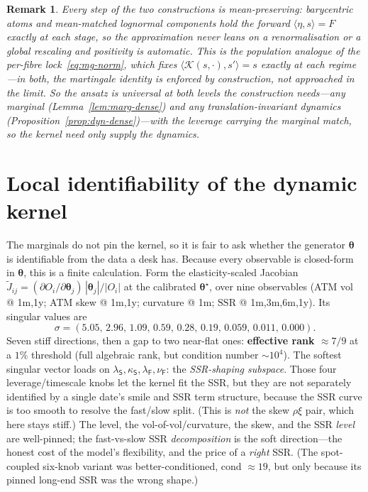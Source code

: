 \documentclass[11pt]{article}
\newtheorem{remark}{Remark}
\newcommand{\cK}{\mathcal{K}}
\newcommand{\SSR}{\mathrm{SSR}}
\newcommand{\bth}{{\boldsymbol{\theta}}}
\begin{document}
\begin{remark}
Every step of the two constructions is \emph{mean-preserving}: barycentric atoms and mean-matched
lognormal components hold the forward $\langle\eta,s\rangle=F$ exactly at each stage, so the approximation
never leans on a renormalisation or a global rescaling and positivity is automatic. This is the population
analogue of the per-fibre lock~\eqref{eq:mg-norm}, which fixes $\langle\cK(s,\cdot),s'\rangle=s$ exactly at
each regime---in both, the martingale identity is enforced by construction, not approached in the limit. So
the ansatz is universal at both levels the construction needs---any marginal (Lemma~\ref{lem:marg-dense})
and any translation-invariant dynamics (Proposition~\ref{prop:dyn-dense})---with the leverage carrying the
marginal match, so the kernel need only supply the dynamics.
\end{remark}


\section{Local identifiability of the dynamic kernel}
\label{app:ident}

The marginals do not pin the kernel, so it is fair to ask whether the generator $\bth$ is
identifiable from the data a desk has. Because every observable is closed-form in $\bth$, this is a finite calculation. Form the
elasticity-scaled Jacobian $\tilde J_{ij}=(\partial O_i/\partial\bth_j)\,|\bth_j|/|O_i|$ at the
calibrated $\bth^\star$, over nine observables (ATM vol @ 1m,1y; ATM skew @ 1m,1y; curvature @ 1m;
$\SSR$ @ 1m,3m,6m,1y). Its singular values are
\begin{equation}
\sigma=(5.05,\,2.96,\,1.09,\,0.59,\,0.28,\,0.19,\,\mathbf{0.059},\,\mathbf{0.011},\,\mathbf{0.000}).
\end{equation}
Seven stiff directions, then a gap to two near-flat ones: \textbf{effective rank
$\approx 7/9$} at a $1\%$ threshold (full algebraic rank, but condition number $\sim\!10^4$).
The softest singular vector loads on
$\lambda_{\mathsf{S}},\kappa_{\mathsf{S}},\lambda_{\mathsf{F}},\nu_{\mathsf{F}}$: the
\emph{SSR-shaping subspace}. Those four leverage/timescale knobs let the kernel fit the SSR, but
they are not separately identified by a single date's smile and SSR term structure, because the SSR
curve is too smooth to resolve the fast/slow split. (This is \emph{not} the skew $\rho\xi$ pair,
which here stays stiff.) The level, the vol-of-vol/curvature, the skew, and
the SSR \emph{level} are well-pinned; the fast-vs-slow SSR \emph{decomposition} is the soft
direction---the honest cost of the model's flexibility, and the price of a \emph{right} SSR.
(The spot-coupled six-knob variant was better-conditioned, cond $\approx 19$, but
only because its pinned long-end SSR was the wrong shape.)
\end{document}
